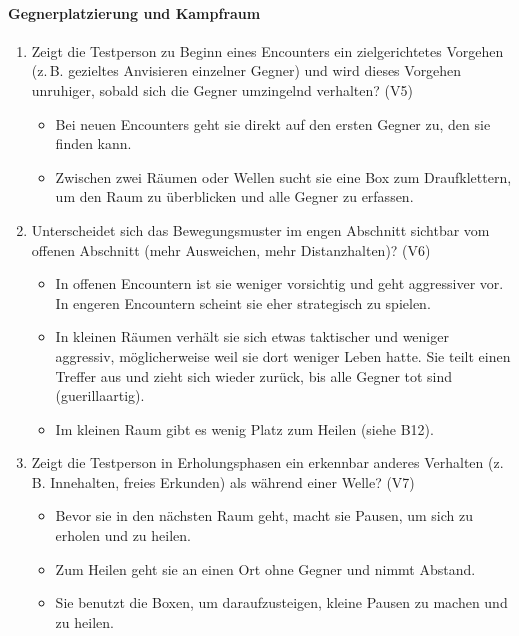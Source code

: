 \documentclass[../Main.tex]{subfiles}
\begin{document}
\paragraph{Gegnerplatzierung und Kampfraum}
\begin{enumerate}[label=\textbf{B\arabic*}, leftmargin=1.5cm, itemsep=0.8em, resume]
    \item Zeigt die Testperson zu Beginn eines Encounters ein zielgerichtetes Vorgehen (z.\,B. gezieltes Anvisieren einzelner Gegner) und wird dieses Vorgehen unruhiger, sobald sich die Gegner umzingelnd verhalten? \hfill (V5)
    \begin{itemize}[nosep]
        \item Bei neuen Encounters geht sie direkt auf den ersten Gegner zu, den sie finden kann.
        \item Zwischen zwei Räumen oder Wellen sucht sie eine Box zum Draufklettern, um den Raum zu überblicken und alle Gegner zu erfassen.
    \end{itemize}

    \item Unterscheidet sich das Bewegungsmuster im engen Abschnitt sichtbar vom offenen Abschnitt (mehr Ausweichen, mehr Distanzhalten)? \hfill (V6)
    \begin{itemize}[nosep]
        \item In offenen Encountern ist sie weniger vorsichtig und geht aggressiver vor. In engeren Encountern scheint sie eher strategisch zu spielen.
        \item In kleinen Räumen verhält sie sich etwas taktischer und weniger aggressiv, möglicherweise weil sie dort weniger Leben hatte. Sie teilt einen Treffer aus und zieht sich wieder zurück, bis alle Gegner tot sind (guerillaartig).
        \item Im kleinen Raum gibt es wenig Platz zum Heilen (siehe B12).
    \end{itemize}

    \item Zeigt die Testperson in Erholungsphasen ein erkennbar anderes Verhalten (z.\,B. Innehalten, freies Erkunden) als während einer Welle? \hfill (V7)
    \begin{itemize}[nosep]
        \item Bevor sie in den nächsten Raum geht, macht sie Pausen, um sich zu erholen und zu heilen.
        \item Zum Heilen geht sie an einen Ort ohne Gegner und nimmt Abstand.
        \item Sie benutzt die Boxen, um daraufzusteigen, kleine Pausen zu machen und zu heilen.
    \end{itemize}


\end{enumerate}
\end{document}
